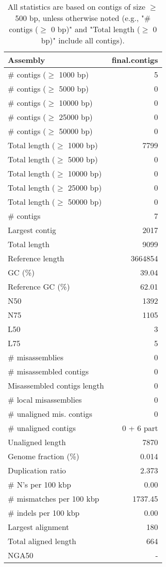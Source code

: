 \documentclass[12pt,a4paper]{article}
\begin{document}
\begin{table}[ht]
\begin{center}
\caption{All statistics are based on contigs of size $\geq$ 500 bp, unless otherwise noted (e.g., "\# contigs ($\geq$ 0 bp)" and "Total length ($\geq$ 0 bp)" include all contigs).}
\begin{tabular}{|l*{1}{|r}|}
\hline
Assembly & final.contigs \\ \hline
\# contigs ($\geq$ 1000 bp) & 5 \\ \hline
\# contigs ($\geq$ 5000 bp) & 0 \\ \hline
\# contigs ($\geq$ 10000 bp) & 0 \\ \hline
\# contigs ($\geq$ 25000 bp) & 0 \\ \hline
\# contigs ($\geq$ 50000 bp) & 0 \\ \hline
Total length ($\geq$ 1000 bp) & 7799 \\ \hline
Total length ($\geq$ 5000 bp) & 0 \\ \hline
Total length ($\geq$ 10000 bp) & 0 \\ \hline
Total length ($\geq$ 25000 bp) & 0 \\ \hline
Total length ($\geq$ 50000 bp) & 0 \\ \hline
\# contigs & 7 \\ \hline
Largest contig & 2017 \\ \hline
Total length & 9099 \\ \hline
Reference length & 3664854 \\ \hline
GC (\%) & 39.04 \\ \hline
Reference GC (\%) & 62.01 \\ \hline
N50 & 1392 \\ \hline
N75 & 1105 \\ \hline
L50 & 3 \\ \hline
L75 & 5 \\ \hline
\# misassemblies & 0 \\ \hline
\# misassembled contigs & 0 \\ \hline
Misassembled contigs length & 0 \\ \hline
\# local misassemblies & 0 \\ \hline
\# unaligned mis. contigs & 0 \\ \hline
\# unaligned contigs & 0 + 6 part \\ \hline
Unaligned length & 7870 \\ \hline
Genome fraction (\%) & 0.014 \\ \hline
Duplication ratio & 2.373 \\ \hline
\# N's per 100 kbp & 0.00 \\ \hline
\# mismatches per 100 kbp & 1737.45 \\ \hline
\# indels per 100 kbp & 0.00 \\ \hline
Largest alignment & 180 \\ \hline
Total aligned length & 664 \\ \hline
NGA50 & - \\ \hline
\end{tabular}
\end{center}
\end{table}
\end{document}
